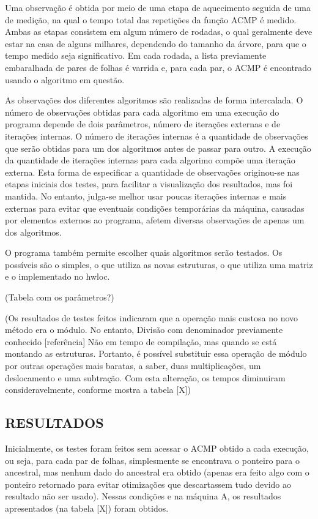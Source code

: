 Uma observação é obtida por meio de uma etapa de aquecimento seguida de uma de medição, na qual o tempo total das repetições da função ACMP é medido.
Ambas as etapas consistem em algum número de rodadas, o qual geralmente deve estar na casa de alguns milhares, dependendo do tamanho da árvore, para que o tempo medido seja significativo.
Em cada rodada, a lista previamente embaralhada de pares de folhas é varrida e, para cada par, o ACMP é encontrado usando o algoritmo em questão.

As observações dos diferentes algoritmos são realizadas de forma intercalada.
O número de observações obtidas para cada algoritmo em uma execução do programa depende de dois parâmetros, número de iterações externas e de iterações internas.
O número de iterações internas é a quantidade de observações que serão obtidas para um dos algoritmos antes de passar para outro.
A execução da quantidade de iterações internas para cada algorimo compõe uma iteração externa.
Esta forma de especificar a quantidade de observações originou-se nas etapas iniciais dos testes, para facilitar a visualização dos resultados, mas foi mantida.
No entanto, julga-se melhor usar poucas iterações internas e mais externas para evitar que eventuais condições temporárias da máquina, causadas por elementos externos ao programa, afetem diversas observações de apenas um dos algoritmos.

O programa também permite escolher quais algoritmos serão testados.
Os possíveis são o simples, o que utiliza as novas estruturas, o que utiliza uma matriz e o implementado no hwloc.

(Tabela com os parâmetros?)


(Os resultados de testes feitos indicaram que a operação mais custosa no novo método era o módulo.
No entanto, 
Divisão com denominador previamente conhecido [referência]
Não em tempo de compilação, mas quando se está montando as estruturas.
Portanto, é possível substituir essa operação de módulo por outras operações mais baratas, a saber, duas multiplicações, um deslocamento e uma subtração.
Com esta alteração, os tempos diminuiram consideravelmente, conforme mostra a tabela [X])


\subsection{RESULTADOS}

Inicialmente, os testes foram feitos sem acessar o ACMP obtido a cada execução, ou seja, para cada par de folhas, simplesmente se encontrava o ponteiro para o ancestral, mas nenhum dado do ancestral era obtido (apenas era feito algo com o ponteiro retornado para evitar otimizações que descartassem tudo devido ao resultado não ser usado).
Nessas condições e na máquina A, os resultados apresentados (na tabela [X]) foram obtidos.

